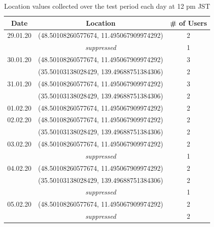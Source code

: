 \begin{table}[htbp]
	\centering
	\begin{tabular}{|c|c|c|} 
		\hline
		\textbf{Date} & \textbf{Location} & \textbf{\# of Users} \\ [0.5ex] 
		\hline
		29.01.20 & (48.50108260577674, 11.495067909974292) & 2 \\
		&\textit{suppressed} & 1 \\
		\hline
		30.01.20 & (48.50108260577674, 11.495067909974292) & 3 \\ 
		& (35.50103138028429, 139.49688751384306) & 2 \\
		\hline
		31.01.20 & (48.50108260577674, 11.495067909974292) & 3 \\ 
		& (35.50103138028429, 139.49688751384306) & 2 \\
		\hline
		01.02.20 & (48.50108260577674, 11.495067909974292) & 2 \\ 
		\hline
		02.02.20 & (48.50108260577674, 11.495067909974292) & 2 \\ 
		& (35.50103138028429, 139.49688751384306) & 2 \\
		\hline
		03.02.20 & (48.50108260577674, 11.495067909974292) & 2 \\ 
		&\textit{suppressed} & 1 \\
		\hline
		04.02.20 & (48.50108260577674, 11.495067909974292) & 2 \\ 
		& (35.50103138028429, 139.49688751384306) & 2 \\
		&\textit{suppressed} & 1 \\
		\hline
		05.02.20 & (48.50108260577674, 11.495067909974292) & 2 \\
		&\textit{suppressed} & 2 \\
		\hline
	\end{tabular}
	\caption{Location values collected over the test period each day at 12 pm JST}
	\label{tab:location_jst}
\end{table}

